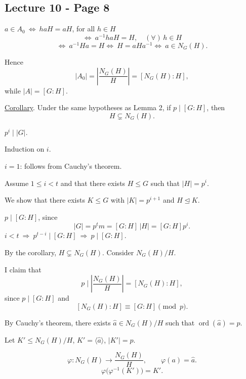 \bigskip

\subsection*{Lecture 10 - Page 8}

\noindent $a\in A_0\ \Longleftrightarrow\ haH=aH$, for all $h\in H$
\[
\Longleftrightarrow\ a^{-1}haH=H,\quad(\forall)\,h\in H
\]
\[
\Longleftrightarrow\ a^{-1}Ha=H
\Longleftrightarrow\ H=aHa^{-1}
\Longleftrightarrow\ a\in N_G(H).
\]

\noindent Hence
\[
|A_0|=\left|\frac{N_G(H)}{H}\right|=[N_G(H):H],
\]
\noindent while $|A|=[G:H]$.

\bigskip
\noindent\underline{Corollary}. Under the same hypotheses as Lemma 2,
if $p\mid[G:H]$, then
\[
H\subsetneq N_G(H).
\]

\bigskip
\noindent{}\quad
$p^i\mid |G|$.

\medskip
\noindent Induction on $i$.

\noindent $i=1$: follows from Cauchy's theorem.

\medskip
\noindent Assume $1\leq i<t$ and that there exists $H\leq G$
such that $|H|=p^i$.

\noindent We show that there exists $K\leq G$ with
$|K|=p^{i+1}$ and $H\trianglelefteq K$.

\medskip
\noindent $p\mid[G:H]$, since
\[
|G|=p^t m=[G:H]\,|H|=[G:H]p^i.
\]
\noindent $i<t\ \Longrightarrow\ p^{t-i}\mid[G:H]
\ \Longrightarrow\ p\mid[G:H]$.

\medskip
\noindent By the corollary, $H\subsetneq N_G(H)$.
Consider $N_G(H)/H$.

\medskip
\noindent I claim that
\[
p\mid\left|\frac{N_G(H)}{H}\right|=[N_G(H):H],
\]
\noindent since $p\mid[G:H]$ and
\[
[N_G(H):H]\equiv[G:H]\pmod p.
\]

\noindent By Cauchy's theorem, there exists
$\hat a\in N_G(H)/H$ such that $\operatorname{ord}(\hat a)=p$.

\medskip
\noindent Let $K'\leq N_G(H)/H$, $K'=\langle\hat a\rangle$,
$|K'|=p$.

\[
\varphi:N_G(H)\longrightarrow\frac{N_G(H)}{H},
\qquad \varphi(a)=\hat a.
\]
\[
\varphi\bigl(\varphi^{-1}(K')\bigr)=K'.
\]
